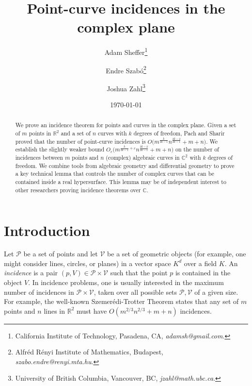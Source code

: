 \documentclass[letterpaper, reqno,11pt]{article}
\theoremstyle{remark}
\newcommand{\RR}{\mathbb{R}}
\newcommand{\CC}{\mathbb{C}}
\newcommand{\pts}{\mathcal P}
\newcommand{\vrts}{\mathcal V}
\newcommand{\eps}{\varepsilon}
\begin{document}
\title{Point-curve incidences in the complex plane}

\author{
Adam Sheffer\thanks{California Institute of Technology, Pasadena, CA,
{\sl adamsh@gmail.com}.}
\and
Endre Szab\'o\thanks{Alfr\'ed R\'enyi Institute of Mathematics,
  Budapest, {\sl szabo.endre@renyi.mta.hu}.
}
\and
Joshua Zahl\thanks{University of British Columbia, Vancouver, BC,  {\sl jzahl@math.ubc.ca}.}
}
\date{\today}

\maketitle

%
%
%
%
\begin{abstract}
We prove an incidence theorem for points and curves in the complex plane. Given a set of $m$ points in $\RR^2$ and a set of $n$ curves with $k$ degrees of freedom, Pach and Sharir proved that the number of point-curve incidences is $O\big(m^{\frac{k}{2k-1}}n^{\frac{2k-2}{2k-1}}+m+n\big)$. We establish the slightly weaker bound $O_\eps\big(m^{\frac{k}{2k-1}+\eps}n^{\frac{2k-2}{2k-1}}+m+n\big)$ on the number of incidences between $m$ points and $n$ (complex) algebraic curves in $\CC^2$ with $k$ degrees of freedom. We combine tools from algebraic geometry and differential geometry to prove a key technical lemma that controls the number of complex curves that can be contained inside a real hypersurface. This lemma may be of independent interest to other researchers proving incidence theorems over $\CC$.
\end{abstract}
%
%
%
\maketitle
%
%
%
\section{Introduction}
Let $\pts$ be a set of points and let $\vrts$ be a set of geometric objects (for example, one might consider lines, circles, or planes) in a vector space $K^d$ over a field $K$. An \emph{incidence} is a pair $(p,V)\in \pts \times \vrts$ such that the point $p$ is contained in the object $V$. In incidence problems, one is usually interested in the maximum number of incidences in $\pts \times \vrts$, taken over all possible sets $\pts,\vrts$ of a given size. For example, the well-known Szemer\'edi-Trotter Theorem \cite{Szemeredi} states that any set of $m$ points and  $n$ lines in $\RR^2$ must have $O(m^{2/3}n^{2/3}+m+n)$ incidences.
\end{document}
